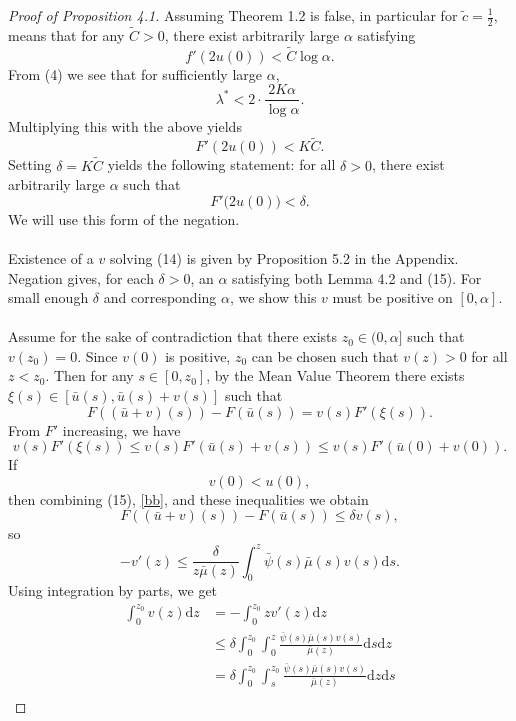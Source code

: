 \documentclass{article}
\begin{document}
\begin{proof}[Proof of Proposition 4.1]
    Assuming Theorem 1.2 is false, in particular for $\tilde c=\frac 12$, means that for any $\widetilde C > 0$, there exist arbitrarily large $\alpha$ satisfying
    \[f'(2u(0)) < \widetilde C\log \alpha.\]
    From (4) we see that for sufficiently large $\alpha$,
    \[\lambda^*  < 2\cdot \frac{2K\alpha}{\log\alpha}.\]
    Multiplying this with the above yields
    \[F'(2u(0)) < K\widetilde C.\]
    Setting $\delta = K\widetilde C$ yields the following statement: for all $\delta >0$, there exist arbitrarily large $\alpha$ such that
    \begin{equation}
        F'\bigl(2u(0)\bigr) < \delta.
    \end{equation}
    We will use this form of the negation.\\ \\
    Existence of a $v$ solving (14) is given by Proposition 5.2 in the Appendix. Negation gives, for each $\delta > 0$, an $\alpha$ satisfying both Lemma 4.2 and (15). For small enough $\delta$ and corresponding $\alpha$, we show this $v$ must be positive on $[0,\alpha]$. \\ \\
    Assume for the sake of contradiction that there exists $z_0\in(0,\alpha]$ such that $v(z_0) = 0$. Since $v(0)$ is positive, $z_0$ can be chosen such that $v(z) > 0$ for all $z < z_0$. Then for any $s\in [0,z_0]$, by the Mean Value Theorem there exists $\xi(s)\in[\bar u(s), \bar u(s) + v(s)]$ such that
    \begin{equation}\label{bb}
        F((\bar u + v)(s)) - F(\bar u(s)) = v(s)F'(\xi(s)).
    \end{equation}
    From $F'$ increasing, we have
    \[v(s)F'(\xi(s)) \leq v(s)F'(\bar u(s)+v(s)) \leq v(s)F'(\bar u(0) + v(0)).\]
    If
    \[v(0) < u(0),\]
    then combining (15), \eqref{bb}, and these inequalities we obtain
    \[F((\bar u + v)(s)) - F(\bar u(s)) \leq \delta v(s),\]
    so
    \[-v'(z) \leq \frac{\delta}{z\bar\mu(z)}\int_0^z \bar\psi(s)\bar\mu(s)v(s)\mathrm{d}s.\]
    Using integration by parts, we get
    \begin{align*}
        \int_0^{z_0} v(z)\mathrm{d}z &= -\int_0^{z_0}zv'(z)\mathrm{d}z \\
        &\leq\delta\int_0^{z_0}\int_0^z \frac{\bar\psi(s)\bar\mu(s)v(s)}{\bar \mu(z)}\mathrm{d}s\mathrm{d}z \\
        &= \delta\int_{0}^{z_0}\int_{s}^{z_0}\frac{\bar\psi(s)\bar\mu(s)v(s)}{\bar \mu(z)}\mathrm{d}z\mathrm{d}s \\

\end{align*}
\end{proof}
\end{document}
